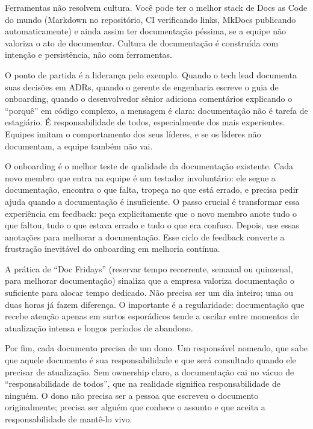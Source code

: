 Ferramentas não resolvem cultura. Você pode ter o melhor stack de Docs
as Code do mundo (Markdown no repositório, CI verificando links,
MkDocs publicando automaticamente) e ainda assim ter documentação
péssima, se a equipe não valoriza o ato de documentar. Cultura de
documentação é construída com intenção e persistência, não com
ferramentas.

O ponto de partida é a liderança pelo exemplo. Quando o tech lead
documenta suas decisões em ADRs, quando o gerente de engenharia escreve
o guia de onboarding, quando o desenvolvedor sênior adiciona comentários
explicando o ``porquê'' em código complexo, a mensagem é clara:
documentação não é tarefa de estagiário. É responsabilidade de todos,
especialmente dos mais experientes. Equipes imitam o comportamento dos
seus líderes, e se os líderes não documentam, a equipe também não vai.

O onboarding é o melhor teste de qualidade da documentação existente.
Cada novo membro que entra na equipe é um testador involuntário: ele
segue a documentação, encontra o que falta, tropeça no que está errado,
e precisa pedir ajuda quando a documentação é insuficiente. O passo
crucial é transformar essa experiência em feedback: peça explicitamente
que o novo membro anote tudo o que faltou, tudo o que estava errado e
tudo o que era confuso. Depois, use essas anotações para melhorar a
documentação. Esse ciclo de feedback converte a frustração inevitável
do onboarding em melhoria contínua.

A prática de ``Doc Fridays'' (reservar tempo recorrente,
semanal ou quinzenal, para melhorar documentação) sinaliza
que a empresa valoriza documentação o suficiente para alocar tempo
dedicado. Não precisa ser um dia inteiro; uma ou duas horas já fazem
diferença. O importante é a regularidade: documentação que recebe
atenção apenas em surtos esporádicos tende a oscilar entre momentos
de atualização intensa e longos períodos de abandono.

Por fim, cada documento precisa de um dono. Um responsável nomeado,
que sabe que aquele documento é sua responsabilidade e que será
consultado quando ele precisar de atualização. Sem ownership claro,
a documentação cai no vácuo de ``responsabilidade de todos'', que
na realidade significa responsabilidade de ninguém. O dono não precisa
ser a pessoa que escreveu o documento originalmente; precisa ser alguém
que conhece o assunto e que aceita a responsabilidade de mantê-lo vivo.


